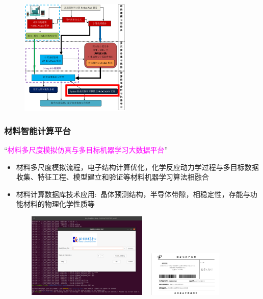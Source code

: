\begin{frame}
\begin{minipage}[b]{0.47\linewidth}
\begin{figure}[h!]
\includegraphics[height=2.18in]{Figures/MP_comp_BCC.png}
\caption{\fontsize{6.5pt}{4.5pt}\selectfont{适用于异质界面的高通量材料计算自动流程软件架构}}%
\label{MP_comp_BCC}
\end{figure}
\end{minipage}
\end{frame}

\begin{frame}
	\frametitle{材料智能计算平台}
	“\textcolor{magenta}{材料多尺度模拟仿真与多目标机器学习大数据平台}”
	\begin{itemize}
		\item 材料多尺度模拟流程，电子结构计算优化，化学反应动力学过程与多目标数据收集、特征工程、模型建立和验证等材料机器学习算法相融合
		\item 材料计算数据库技术应用:~晶体预测结构，半导体带隙，相稳定性，存能与功能材料的物理化学性质等
	\end{itemize}
\begin{figure}[h!]
\centering
\vspace*{-7pt}
\includegraphics[height=1.60in,width=2.55in,viewport=0 0 1200 870,clip]{Figures/BCC-Process_1.png}
\includegraphics[height=0.85in,width=1.40in,viewport=0 0 801 486,clip]{Figures/Patent_license.png}
\label{BCC-Process_1}
\end{figure}
\end{frame}

